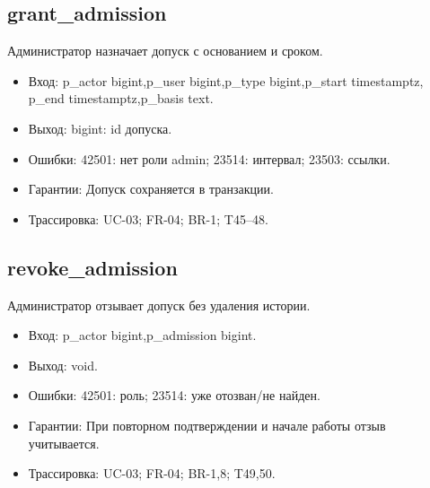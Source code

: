 \subsection{grant\_\allowbreak{}admission}
Администратор назначает допуск с основанием и сроком.
\begin{itemize}
\item Вход: p\_\allowbreak{}actor bigint,p\_\allowbreak{}user bigint,p\_\allowbreak{}type bigint,p\_\allowbreak{}start timestamptz,  p\_\allowbreak{}end timestamptz,p\_\allowbreak{}basis text.
\item Выход: bigint: id допуска.
\item Ошибки: 42501: нет роли admin; 23514: интервал; 23503: ссылки.
\item Гарантии: Допуск сохраняется в транзакции.
\item Трассировка: UC-03; FR-04; BR-1; T45–48.
\end{itemize}
\subsection{revoke\_\allowbreak{}admission}
Администратор отзывает допуск без удаления истории.
\begin{itemize}
\item Вход: p\_\allowbreak{}actor bigint,p\_\allowbreak{}admission bigint.
\item Выход: void.
\item Ошибки: 42501: роль; 23514: уже отозван/\allowbreak{}не найден.
\item Гарантии: При повторном подтверждении и начале работы отзыв учитывается.
\item Трассировка: UC-03; FR-04; BR-1,8; T49,50.
\end{itemize}